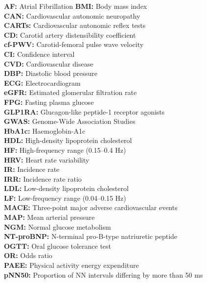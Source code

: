 \documentclass[
  a4paper,
  headsepline=true,
  open=left]{scrbook}
\begin{document}

\textbf{AF:} Atrial Fibrillation \textbf{BMI:} Body mass index\\
\textbf{CAN:} Cardiovascular autonomic neuropathy\\
\textbf{CARTs:} Cardiovascular autonomic reflex tests\\
\textbf{CD:} Carotid artery distensibility coefficient\\
\textbf{cf-PWV:} Carotid-femoral pulse wave velocity\\
\textbf{CI:} Confidence interval\\
\textbf{CVD:} Cardiovascular disease\\
\textbf{DBP:} Diastolic blood pressure\\
\textbf{ECG:} Electrocardiogram\\
\textbf{eGFR:} Estimated glomerular filtration rate\\
\textbf{FPG:} Fasting plasma glucose\\
\textbf{GLP1RA:} Glucagon-like peptide-1 receptor agonists\\
\textbf{GWAS:} Genome-Wide Association Studies\\
\textbf{HbA1c:} Haemoglobin-A1c\\
\textbf{HDL:} High-density lipoprotein cholesterol\\
\textbf{HF:} High-frequency range (0.15--0.4 Hz)\\
\textbf{HRV:} Heart rate variability\\
\textbf{IR:} Incidence rate\\
\textbf{IRR:} Incidence rate ratio\\
\textbf{LDL:} Low-density lipoprotein cholesterol\\
\textbf{LF:} Low-frequency range (0.04--0.15 Hz)\\
\textbf{MACE:} Three-point major adverse cardiovascular events\\
\textbf{MAP:} Mean arterial pressure\\
\textbf{NGM:} Normal glucose metabolism\\
\textbf{NT-proBNP:} N-terminal pro-B-type natriuretic peptide\\
\textbf{OGTT:} Oral glucose tolerance test\\
\textbf{OR:} Odds ratio\\
\textbf{PAEE:} Physical activity energy expenditure\\
\textbf{pNN50:} Proportion of NN intervals differing by more than 50
ms\\
\end{document}

